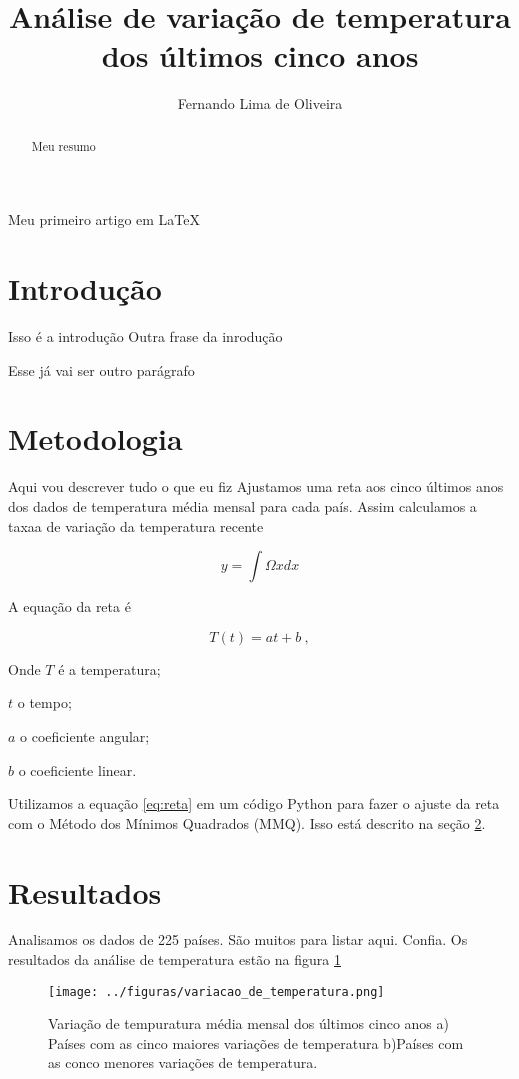 \documentclass{article}
\begin{document}
\title{Análise de variação de temperatura dos últimos cinco anos}
\author{Fernando Lima de Oliveira}
\maketitle

\begin{abstract}
Meu resumo
\end{abstract}

Meu primeiro artigo em LaTeX

\section{Introdução}

Isso é a introdução
Outra frase da inrodução

Esse já vai ser outro parágrafo

\section{Metodologia}
\label{sec:metodos}

	Aqui vou descrever tudo o que eu fiz
Ajustamos uma reta aos cinco últimos anos dos dados
de temperatura média mensal para cada país.
Assim calculamos a taxaa de variação da temperatura recente

\begin{equation}
y = \int \Omega x dx
\end{equation}

A equação da reta é

\begin{equation}
T(t) = a t + b \ ,
\label{eq:reta}
\end{equation}

\noindent
Onde $T$ é a temperatura; 

\noindent
$t$ o tempo; 

\noindent
$a$ o coeficiente angular; 

\noindent
$b$ o coeficiente linear.

	Utilizamos a equação \ref{eq:reta} em um código Python para fazer o ajuste da reta com 
o Método dos Mínimos Quadrados (MMQ). Isso está descrito na seção \ref{sec:metodos}.

\section{Resultados}

	Analisamos os dados de 225 países. São muitos para listar aqui. Confia.
Os resultados da análise de temperatura estão na figura \ref{fig:variacao}

\begin{figure}[!htb]
	\centering
	\texttt{[image: ../figuras/variacao\_de\_temperatura.png]}
	\centering
	\caption{
		Variação de tempuratura média mensal dos últimos cinco anos
		a) Países com as cinco maiores variações de temperatura
		b)Países com as conco menores variações de temperatura.
	}
	\label{fig:variacao}
\end{figure}
\end{document}
